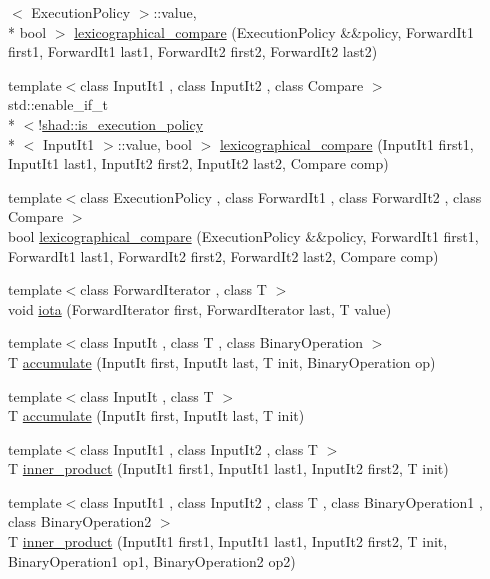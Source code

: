 \begin{DoxyCompactItemize}
$<$ Execution\-Policy $>$\-::value, \\*
bool $>$ \hyperlink{namespaceshad_a060c390865e5dbec41c7e2526fae8803}{lexicographical\-\_\-compare} (Execution\-Policy \&\&policy, Forward\-It1 first1, Forward\-It1 last1, Forward\-It2 first2, Forward\-It2 last2)
\item 
{\footnotesize template$<$class Input\-It1 , class Input\-It2 , class Compare $>$ }\\std\-::enable\-\_\-if\-\_\-t\\*
$<$!\hyperlink{structshad_1_1is__execution__policy}{shad\-::is\-\_\-execution\-\_\-policy}\\*
$<$ Input\-It1 $>$\-::value, bool $>$ \hyperlink{namespaceshad_a05a181e15eb05bb17cf7bedcacc98585}{lexicographical\-\_\-compare} (Input\-It1 first1, Input\-It1 last1, Input\-It2 first2, Input\-It2 last2, Compare comp)
\item 
{\footnotesize template$<$class Execution\-Policy , class Forward\-It1 , class Forward\-It2 , class Compare $>$ }\\bool \hyperlink{namespaceshad_a10090ea72775e10b015408d8c9050ac3}{lexicographical\-\_\-compare} (Execution\-Policy \&\&policy, Forward\-It1 first1, Forward\-It1 last1, Forward\-It2 first2, Forward\-It2 last2, Compare comp)
\item 
{\footnotesize template$<$class Forward\-Iterator , class T $>$ }\\void \hyperlink{namespaceshad_a1406d52ae9f56d5b4a160d37b2b20f3a}{iota} (Forward\-Iterator first, Forward\-Iterator last, T value)
\item 
{\footnotesize template$<$class Input\-It , class T , class Binary\-Operation $>$ }\\T \hyperlink{namespaceshad_a79535b2ad05d27266485f8e299b776cd}{accumulate} (Input\-It first, Input\-It last, T init, Binary\-Operation op)
\item 
{\footnotesize template$<$class Input\-It , class T $>$ }\\T \hyperlink{namespaceshad_a7286bb0b681bec70602b31083a0b0680}{accumulate} (Input\-It first, Input\-It last, T init)
\item 
{\footnotesize template$<$class Input\-It1 , class Input\-It2 , class T $>$ }\\T \hyperlink{namespaceshad_ae17dfe23117ed2d68100db112d13d5e2}{inner\-\_\-product} (Input\-It1 first1, Input\-It1 last1, Input\-It2 first2, T init)
\item 
{\footnotesize template$<$class Input\-It1 , class Input\-It2 , class T , class Binary\-Operation1 , class Binary\-Operation2 $>$ }\\T \hyperlink{namespaceshad_a9e35d019afa66a7d241f01c4c28a5c14}{inner\-\_\-product} (Input\-It1 first1, Input\-It1 last1, Input\-It2 first2, T init, Binary\-Operation1 op1, Binary\-Operation2 op2)

\end{DoxyCompactItemize}
